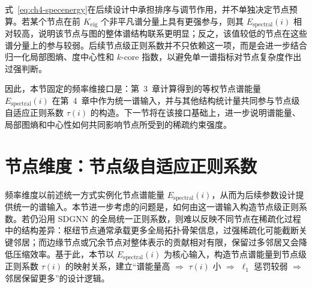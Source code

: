 式~\eqref{eq:ch4-specenergy}在后续设计中承担排序与调节作用，并不单独决定节点预算。若某个节点在前 \(K_{\text{eig}}\) 个非平凡谱分量上具有更强参与，则其 \(E_{\text{spectral}}(i)\) 相对较高，说明该节点与图的整体谱结构联系更明显；反之，该值较低的节点在这些谱分量上的参与较弱。后续节点级正则系数并不只依赖这一项，而是会进一步结合归一化局部图熵、度中心性和 \(k\)-core 指数，以避免单一谱指标对节点复杂度作出过强判断。

因此，本节固定的频率维接口是：第~3~章计算得到的等权节点谱能量 \(E_{\text{spectral}}(i)\) 在第~4~章中作为统一谱输入，并与其他结构统计量共同参与节点级自适应正则系数 \(\tau(i)\) 的构造。下一节将在该接口基础上，进一步说明谱能量、局部图熵和中心性如何共同影响节点所受到的稀疏约束强度。



\section{节点维度：节点级自适应正则系数}
\label{sec:ch4-node}
\label{idx:theme:tau}
频率维度以前述统一方式实例化节点谱能量 \(E_{\text{spectral}}(i)\)，从而为后续参数设计提供统一的谱输入。本节进一步考虑的问题是，如何由这一谱输入构造节点级正则系数。若仍沿用 SDGNN 的全局统一正则系数，则难以反映不同节点在稀疏化过程中的结构差异：枢纽节点通常承载更多全局拓扑骨架信息，过强稀疏化可能截断关键邻居；而边缘节点或冗余节点对整体表示的贡献相对有限，保留过多邻居又会降低压缩效率。基于此，本节以 \(E_{\text{spectral}}(i)\) 为核心输入，构造节点谱能量到节点级正则系数 \(\tau(i)\) 的映射关系，建立“谱能量高 \(\Rightarrow\) \(\tau(i)\) 小 \(\Rightarrow\) \(\ell_1\) 惩罚较弱 \(\Rightarrow\) 邻居保留更多”的设计逻辑。

